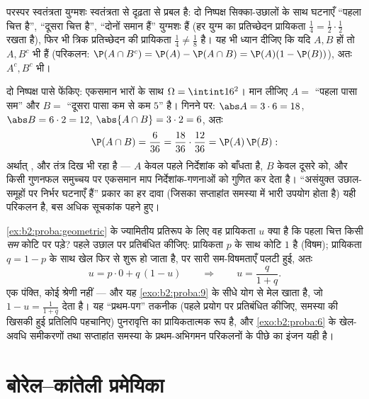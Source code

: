 \begin{remark}
परस्पर स्वतंत्रता युग्मशः स्वतंत्रता से दृढ़ता से प्रबल है: दो
निष्पक्ष सिक्का-उछालों के साथ घटनाएँ ``पहला चित्त है'', ``दूसरा
चित्त है'', ``दोनों समान हैं'' युग्मशः  हैं (हर युग्म का
प्रतिच्छेदन प्रायिकता $\frac14 =
\frac12\cdot\frac12$ रखता है), फिर भी त्रिक प्रतिच्छेदन की
प्रायिकता $\frac14 \neq \frac18$ है। यह भी ध्यान दीजिए कि यदि $A, B$  हों तो
$A, B^c$ भी हैं (परिकलन: $\P(A \cap B^c) = \P(A) - \P(A\cap B) =
\P(A)(1 - \P(B))$), अतः $A^c, B^c$ भी।
\end{remark}

\begin{example}\label{ex:b2:proba:productindep}
दो निष्पक्ष पासे फेंकिए: एकसमान भारों के साथ $\Omega = \intint16^2$। मान लीजिए $A = {}$
``पहला पासा सम'' और $B = {}$ ``दूसरा पासा कम से कम $5$'' है। गिनने पर:
$\abs A = 3\cdot6 = 18$, $\abs B = 6\cdot2 = 12$, $\abs{A\cap B} = 3\cdot2 = 6$, अतः
\[
\P(A\cap B) = \frac6{36} = \frac{18}{36}\cdot\frac{12}{36} =
\P(A)\,\P(B) :
\]
अर्थात् , और तंत्र दिख भी रहा है --- $A$ केवल पहले
निर्देशांक को बाँधता है, $B$ केवल दूसरे को, और किसी गुणनफल
समुच्चय पर एकसमान माप निर्देशांक-गणनाओं को गुणित कर देता है।
``असंयुक्त उछाल-समूहों पर निर्भर घटनाएँ  हैं'' प्रकार का हर
दावा (जिसका सप्ताहांत समस्या में भारी उपयोग होता है) यही परिकलन
है, बस अधिक सूचकांक पहने हुए।
\end{example}

\begin{example}[प्रथम-पग विश्लेषण]\label{ex:b2:proba:firststep}
\cref{ex:b2:proba:geometric} के ज्यामितीय प्रतिरूप के लिए वह प्रायिकता $u$ क्या है कि पहला
चित्त किसी \emph{सम} कोटि पर पड़े? पहले उछाल पर प्रतिबंधित कीजिए:
प्रायिकता $p$ के साथ कोटि $1$ है (विषम); प्रायिकता $q = 1 - p$ के साथ खेल
फिर से शुरू हो जाता है, पर सारी सम-विषमताएँ पलटी हुई, अतः
\[
u = p\cdot0 + q\,(1 - u)
\qquad\Longrightarrow\qquad
u = \frac{q}{1 + q} .
\]
एक पंक्ति, कोई श्रेणी नहीं --- और यह \cref{exo:b2:proba:9} के सीधे योग से मेल खाता
है, जो $1 - u =
\frac1{1+q}$ देता है। यह ``प्रथम-पग'' तकनीक (पहले प्रयोग पर
प्रतिबंधित कीजिए, समस्या की खिसकी हुई प्रतिलिपि पहचानिए)
पुनरावृत्ति का प्रायिकतात्मक रूप है, और \cref{exo:b2:proba:6} के खेल-अवधि समीकरणों
तथा सप्ताहांत समस्या के प्रथम-अभिगमन परिकलनों के पीछे का इंजन यही
है।
\end{example}

\section{बोरेल--कांतेली प्रमेयिका}

